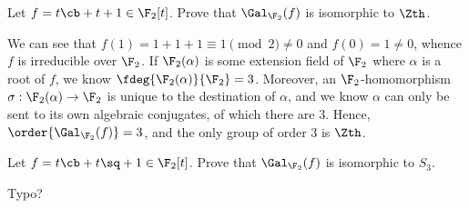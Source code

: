 \documentclass{article}
\begin{document}
\begin{subexercise}
Let $ f = t\cb+t+1\in \F_2[t] $. Prove that $ \Gal_{\F_2}(f) $ is isomorphic to $ \Zth $.
\end{subexercise}
\begin{solution}
We can see that $ f(1) = 1 + 1 + 1 \equiv 1 \pmod 2 \neq 0 $ and $ f(0) = 1 \neq 0 $, whence $ f $ is irreducible over $ \F_2 $.
If $ \F_2(\alpha) $ is some extension field of $ \F_2 $ where $ \alpha $ is a root of $ f $, we know $ \fdeg{\F_2(\alpha)}{\F_2}=3 $.
Moreover, an $ \F_2 $-homomorphism $ \sigma:\F_2(\alpha)\to \F_2 $ is unique to the destination of $ \alpha $, and we know $ \alpha $ can only be sent to its own algebraic conjugates, of which there are 3.
Hence, $ \order{\Gal_{\F_2}(f)}=3 $, and the only group of order 3 is $ \Zth $.
\end{solution}

\begin{subexercise}
Let $ f = t\cb+t\sq+1\in \F_2[t] $. Prove that $ \Gal_{\F_2}(f) $ is isomorphic to $ S_3 $.
\end{subexercise}
\begin{solution}
Typo?
\end{solution}
\end{document}
